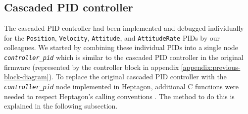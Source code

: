 \documentclass[10pt, a4paper]{article}
\newcommand{\textFunc}[1]{\texttt{\textit{#1}}}
\newcommand{\code}[1]{\texttt{#1}}
\begin{document}
    \subsection{Cascaded PID controller}
    The cascaded PID controller had been implemented and debugged individually for the \code{Position}, \code{Velocity}, \code{Attitude}, and \code{AttitudeRate} PIDs by our colleagues. We started by combining these individual PIDs into a single node \textFunc{controller\_pid} which is similar to the cascaded PID controller in the original firmware (represented by the controller block in appendix \ref{appendix:previous-block-diagram}). To replace the original cascaded PID controller with the \textFunc{controller\_pid} node implemented in Heptagon, additional C functions were needed to respect Heptagon's calling conventions \cite{report:heptagon_manual}. The method to do this is explained in the following subsection.
\end{document}
